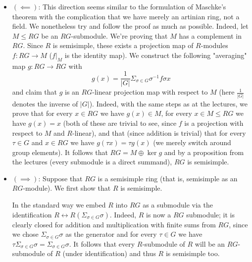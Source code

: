 \documentclass[a4paper, 12pt]{article}
\newcommand{\idtfy}{\longleftrightarrow}
\begin{document}
\begin{itemize}
	\item $(\impliedby)$: This direction seems similar to the formulation of Maschke's theorem with the complication that we have merely an artinian ring, not a field. We nonetheless try and follow the proof as much as possible.
	Indeed, let $M \leq RG$ be an $RG$-submodule. We're proving that $M$ has a complement in $RG$. Since $R$ is semisimple, these exists a projection map of $R$-modules $f\colon RG \to M$ ($f|_M$ is the identity map). We construct the following "averaging" map $g \colon RG \to RG$ with
	\[
	g(x) = \frac{1}{|G|} \Sigma_{\sigma \in G} \sigma^{-1}f\sigma x
	\]
	and claim that $g$ is an $RG$-linear projection map with respect to $M$ (here $\frac{1}{|G|}$ denotes the inverse of $|G|$). Indeed, with the same steps as at the lectures, we prove that for every $x \in RG$ we have $g(x) \in M$, for every $x \in M \leq RG$ we have $g(x) = x$ (both of these are trivial to see, since $f$ is a projection with respect to $M$ and $R$-linear), and that (since addition is trivial) that for every $\tau \in G$ and $x \in RG$ we have $g(\tau x) = \tau g(x)$ (we merely switch around group elements). It follows that $RG = M \oplus \ker g$ and by a proposition from the lectures (every submodule is a direct summand), $RG$ is semisimple.
	\item $(\implies)$: Suppose that $RG$ is a semisimple ring (that is, semisimple as an $RG$-module). We first show that $R$ is semisimple.
	
	In the standard way we embed $R$ into $RG$ as a submodule via the identification $R \idtfy R(\Sigma_{\sigma \in G}\sigma)$. Indeed, $R$ is now a $RG$ submodule; it is clearly closed for addition and multiplication with finite sums from $RG$, since we chose $\Sigma_{\sigma \in G}\sigma$ as the generator and for every $\tau \in G$ we have $\tau\Sigma_{\sigma \in G}\sigma = \Sigma_{\sigma \in G}\sigma$. It follows that every $R$-submodule of $R$ will be an $RG$-submodule of $R$ (under identification) and thus $R$ is semisimple too.
	

\end{itemize}
\end{document}
